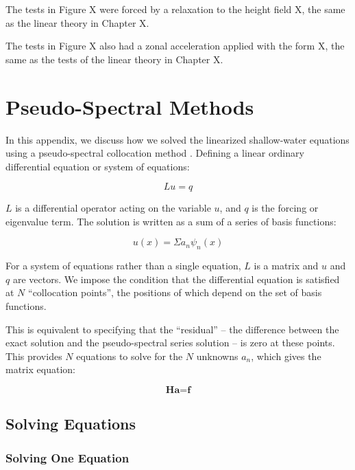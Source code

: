 The tests in Figure X were forced by a relaxation to the height field X, the same as the linear theory in Chapter X.

The tests in Figure X also had a zonal acceleration applied with the form X, the same as the tests of the linear theory in Chapter X.




\chapter{Pseudo-Spectral Methods}\label{ap:ps-methods}


In this appendix, we discuss how we solved the linearized shallow-water equations using a pseudo-spectral collocation method \citep{boyd2000spectral}. Defining a linear ordinary differential equation or system of equations:

\begin{equation}
  L u = q
\end{equation}

$L$ is a differential operator acting on the variable $u$, and $q$ is the forcing or eigenvalue term. The solution is written as a sum of a series of basis functions:

\begin{equation}\label{eqn:pseudospectral_sum}
  u(x) = \Sigma a_{n} \psi_{n}(x)
\end{equation}

For a system of equations rather than a single equation, $L$ is a matrix and $u$ and $q$ are vectors. We impose the condition that the differential equation is satisfied at $N$ ``collocation points'', the positions of which depend on the set of basis functions.

This is equivalent to specifying that the ``residual'' -- the difference between the exact solution and the pseudo-spectral series solution -- is zero at these points. This provides $N$ equations to solve for the $N$ unknowns $a_{n}$, which gives the matrix equation:

\begin{equation}\label{eqn:ps_matrix}
  \textbf{H} \textbf{a} = \textbf{f}
\end{equation}

\section{Solving Equations}


\subsection*{Solving One Equation}

